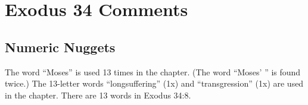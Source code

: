 \section{Exodus 34 Comments}

\subsection{Numeric Nuggets}
The word ``Moses'' is used 13 times in the chapter. (The word ``Moses' '' is found twice.)  The 13-letter words ``longsuffering'' (1x) and  ``transgression'' (1x) are used in the chapter. There are 13 words in Exodus 34:8.
